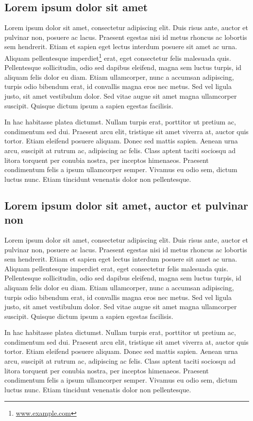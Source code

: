 \documentclass[a4paper,11pt,openany]{book}
\begin{document}
\subsection{Lorem ipsum dolor sit amet}
Lorem ipsum dolor sit amet, consectetur adipiscing elit. Duis risus ante, auctor et pulvinar non, posuere ac lacus. Praesent egestas nisi id metus rhoncus ac lobortis sem hendrerit. Etiam et sapien eget lectus interdum posuere sit amet ac urna. Aliquam pellentesque imperdiet\footnote{\url{www.example.com}} erat, eget consectetur felis malesuada quis. Pellentesque sollicitudin, odio sed dapibus eleifend, magna sem luctus turpis, id aliquam felis dolor eu diam. Etiam ullamcorper, nunc a accumsan adipiscing, turpis odio bibendum erat, id convallis magna eros nec metus. Sed vel ligula justo, sit amet vestibulum dolor. Sed vitae augue sit amet magna ullamcorper suscipit. Quisque dictum ipsum a sapien egestas facilisis.

In hac habitasse platea dictumst. Nullam turpis erat, porttitor ut pretium ac, condimentum sed dui. Praesent arcu elit, tristique sit amet viverra at, auctor quis tortor. Etiam eleifend posuere aliquam. Donec sed mattis sapien. Aenean urna arcu, suscipit at rutrum ac, adipiscing ac felis. Class aptent taciti sociosqu ad litora torquent per conubia nostra, per inceptos himenaeos. Praesent condimentum felis a ipsum ullamcorper semper. Vivamus eu odio sem, dictum luctus nunc. Etiam tincidunt venenatis dolor non pellentesque.

\subsection{Lorem ipsum dolor sit amet, auctor et pulvinar non}
Lorem ipsum dolor sit amet, consectetur adipiscing elit. Duis risus ante, auctor et pulvinar non, posuere ac lacus. Praesent egestas nisi id metus rhoncus ac lobortis sem hendrerit. Etiam et sapien eget lectus interdum posuere sit amet ac urna. Aliquam pellentesque imperdiet erat, eget consectetur felis malesuada quis. Pellentesque sollicitudin, odio sed dapibus eleifend, magna sem luctus turpis, id aliquam felis dolor eu diam. Etiam ullamcorper, nunc a accumsan adipiscing, turpis odio bibendum erat, id convallis magna eros nec metus. Sed vel ligula justo, sit amet vestibulum dolor. Sed vitae augue sit amet magna ullamcorper suscipit. Quisque dictum ipsum a sapien egestas facilisis.

In hac habitasse platea dictumst. Nullam turpis erat, porttitor ut pretium ac, condimentum sed dui. Praesent arcu elit, tristique sit amet viverra at, auctor quis tortor. Etiam eleifend posuere aliquam. Donec sed mattis sapien. Aenean urna arcu, suscipit at rutrum ac, adipiscing ac felis. Class aptent taciti sociosqu ad litora torquent per conubia nostra, per inceptos himenaeos. Praesent condimentum felis a ipsum ullamcorper semper. Vivamus eu odio sem, dictum luctus nunc. Etiam tincidunt venenatis dolor non pellentesque. 
\end{document}
